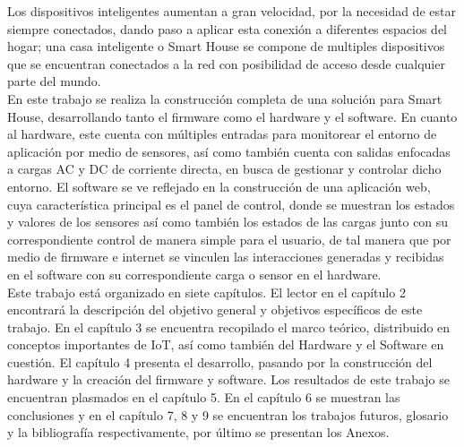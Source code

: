  Los dispositivos inteligentes aumentan a gran velocidad, por la necesidad de estar siempre conectados, dando paso a aplicar esta conexión a diferentes espacios del hogar; una casa inteligente o Smart House se compone de multiples dispositivos que se encuentran conectados a la red con posibilidad de acceso desde cualquier parte del mundo. \\
 
 En este trabajo se realiza la construcción completa de una solución para Smart House, desarrollando tanto el firmware como el hardware y el software. En cuanto al hardware, este cuenta con múltiples entradas para monitorear el entorno de aplicación por medio de sensores, así como también cuenta con salidas enfocadas a cargas AC y DC de corriente directa, en busca de gestionar y controlar dicho entorno. El software se ve reflejado en la construcción de una aplicación web, cuya característica principal es el panel de control, donde se muestran los estados y valores de los sensores así como también los estados de las cargas junto con su correspondiente control de manera simple para el usuario, de tal manera que por medio de firmware e internet se vinculen las interacciones generadas y recibidas en el software con su correspondiente carga o sensor en el hardware.\\
 
 Este trabajo está organizado en siete capítulos. El lector en el capítulo 2 encontrará la descripción del objetivo general y objetivos específicos de este trabajo. En el capítulo 3 se encuentra recopilado el marco teórico, distribuido en conceptos importantes de IoT, así como también del Hardware y el Software en cuestión. El capítulo 4 presenta el desarrollo, pasando por la construcción del hardware y la creación del firmware y software. Los resultados de este trabajo se encuentran plasmados en el capítulo 5. En el capítulo 6 se muestran las conclusiones y en el capítulo 7, 8 y 9 se encuentran los trabajos futuros, glosario y la bibliografía respectivamente, por último se presentan los Anexos.\\
 
